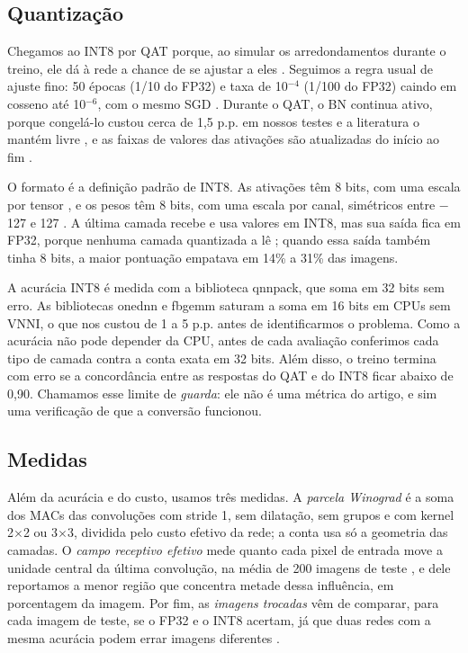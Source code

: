 \documentclass[conference]{IEEEtran}
\newcommand{\by}{\ensuremath{\times}}
\begin{document}
\subsection{Quantização}

Chegamos ao INT8 por QAT porque, ao simular os arredondamentos durante o treino, ele dá à rede a chance de se ajustar a eles
\cite{jacob2018quantization,nagel2021white}. Seguimos a regra usual de ajuste fino: 50 épocas (1/10 do FP32) e taxa de 10$^{-4}$ (1/100
do FP32) caindo em cosseno até 10$^{-6}$, com o mesmo SGD \cite{wu2020integer}. Durante o QAT, o BN continua ativo, porque congelá-lo
custou cerca de 1,5 p.p. em nossos testes e a literatura o mantém livre \cite{wu2020integer,nagel2021white}, e as faixas de valores das
ativações são atualizadas do início ao fim \cite{jacob2018quantization}.

O formato é a definição padrão de INT8. As ativações têm 8 bits, com uma escala por tensor \cite{jacob2018quantization}, e os pesos têm
8 bits, com uma escala por canal, simétricos entre $-$127 e 127 \cite{wu2020integer}. A última camada recebe e usa valores em INT8, mas
sua saída fica em FP32, porque nenhuma camada quantizada a lê \cite{wu2020integer}; quando essa saída também tinha 8 bits, a maior
pontuação empatava em 14\% a 31\% das imagens.

A acurácia INT8 é medida com a biblioteca qnnpack, que soma em 32 bits sem erro. As bibliotecas onednn e fbgemm saturam a soma em 16
bits em CPUs sem VNNI, o que nos custou de 1 a 5 p.p. antes de identificarmos o problema. Como a acurácia não pode depender da CPU,
antes de cada avaliação conferimos cada tipo de camada contra a conta exata em 32 bits. Além disso, o treino termina com erro se a
concordância entre as respostas do QAT e do INT8 ficar abaixo de 0,90. Chamamos esse limite de \textit{guarda}: ele não é uma métrica
do artigo, e sim uma verificação de que a conversão funcionou.

\subsection{Medidas}

Além da acurácia e do custo, usamos três medidas. A \textit{parcela Winograd} é a soma dos MACs das convoluções com stride 1, sem
dilatação, sem grupos e com kernel 2\by2 ou 3\by3, dividida pelo custo efetivo da rede; a conta usa só a geometria das camadas. O
\textit{campo receptivo efetivo} mede quanto cada pixel de entrada move a unidade central da última convolução, na média de 200 imagens
de teste \cite{luo2016understanding}, e dele reportamos a menor região que concentra metade dessa influência, em porcentagem da imagem.
Por fim, as \textit{imagens trocadas} vêm de comparar, para cada imagem de teste, se o FP32 e o INT8 acertam, já que duas redes com a
mesma acurácia podem errar imagens diferentes \cite{hooker2019what}.
\end{document}
